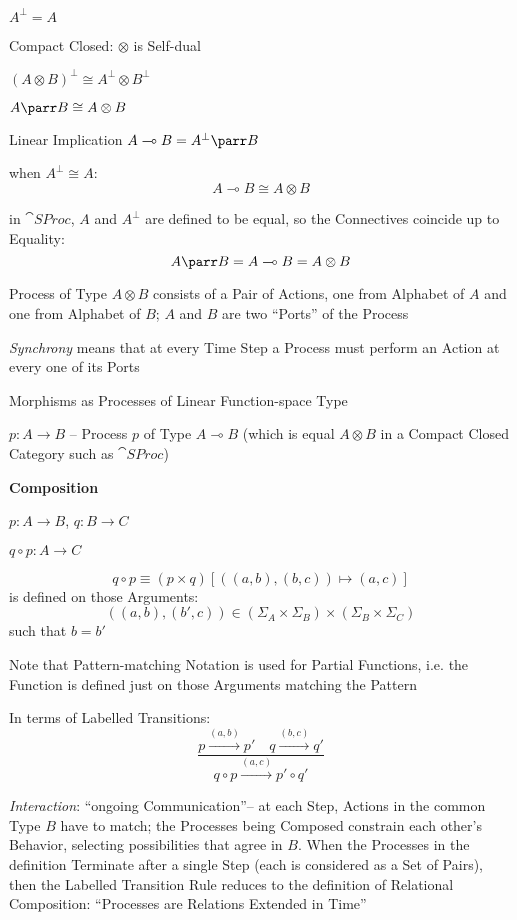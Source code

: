 $A^\bot = A$

Compact Closed: $\otimes$ is Self-dual

$(A \otimes B)^\bot \cong A^\bot \otimes B^\bot$

$A \parr B \cong A \otimes B$

Linear Implication $A \multimap B = A^\bot \parr B$

when $A^\bot \cong A$:
\[
  A \multimap B \cong A \otimes B
\]

in $\cat{SProc}$, $A$ and $A^\bot$ are defined to be equal, so the
Connectives coincide up to Equality:
\[
  A \parr B = A \multimap B = A \otimes B
\]

Process of Type $A \otimes B$ consists of a Pair of Actions, one from
Alphabet of $A$ and one from Alphabet of $B$; $A$ and $B$ are two
``Ports'' of the Process

\emph{Synchrony} means that at every Time Step a Process must perform
an Action at every one of its Ports

Morphisms as Processes of Linear Function-space Type

$p : A \rightarrow B$ -- Process $p$ of Type $A \multimap B$ (which is
equal $A \otimes B$ in a Compact Closed Category such as
$\cat{SProc}$)


\textbf{Composition}

$p : A \rightarrow B$, $q : B \rightarrow C$

$q \circ p : A \rightarrow C$

\[
  q \circ p \equiv (p \times q) [((a,b),(b,c)) \mapsto (a,c)]
\]
is defined on those Arguments:
\[
  ((a,b), (b',c))
    \in (\Sigma_A \times \Sigma_B) \times (\Sigma_B \times \Sigma_C)
\]
such that $b = b'$

\fist Note that Pattern-matching Notation is used for Partial
Functions, i.e. the Function is defined just on those Arguments
matching the Pattern

In terms of Labelled Transitions:
\[
  \frac{p \xrightarrow{(a,b)} p' \quad q \xrightarrow{(b,c)} q'}
  {q \circ p \xrightarrow{(a,c)} p' \circ q'}
\]

\emph{Interaction}: ``ongoing Communication''-- at each Step, Actions
in the common Type $B$ have to match; the Processes being Composed
constrain each other's Behavior, selecting possibilities that agree in
$B$. When the Processes in the definition Terminate after a single
Step (each is considered as a Set of Pairs), then the Labelled
Transition Rule reduces to the definition of Relational Composition:
``Processes are Relations Extended in Time''



